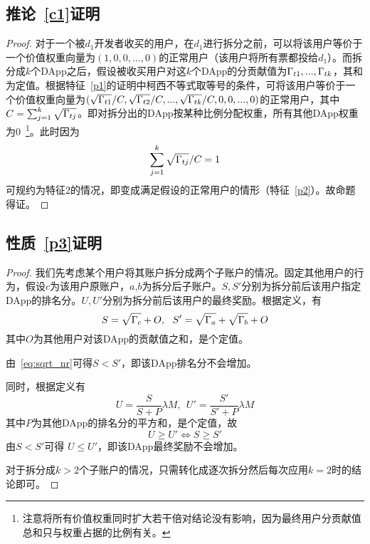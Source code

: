 \subsection{推论~\ref{c1}证明}
\label{subsection:proof3}
\begin{proof}
	对于一个被$d_1$开发者收买的用户，在$d_1$进行拆分之前，可以将该用户等价于一个价值权重向量为$(1,0,0,...,0)$的正常用户（该用户将所有票都投给$d_1$）。而拆分成$k$个DApp之后，假设被收买用户对这$k$个DApp的分贡献值为$\Gamma_{t1},...,\Gamma_{tk}$，其和为定值。根据特征~\ref{p1}的证明中柯西不等式取等号的条件，可将该用户等价于一个价值权重向量为$(\sqrt{\Gamma_{t1}}/C,\sqrt{\Gamma_{t2}}/C,...,\sqrt{\Gamma_{tk}}/C,0,0,...,0)$的正常用户，其中$C=\sum_{j=1}^k \sqrt{\Gamma_{tj}}$。即对拆分出的DApp按某种比例分配权重，所有其他DApp权重为0~\footnote{注意将所有价值权重同时扩大若干倍对结论没有影响，因为最终用户分贡献值总和只与权重占据的比例有关。}。此时因为
	$$\sum_{j=1}^k \sqrt{\Gamma_{tj}}/C =1$$
	可规约为特征2的情况，即变成满足假设的正常用户的情形（特征~\ref{p2}）。故命题得证。
\end{proof}

\subsection{性质~\ref{p3}证明}
\begin{proof}
我们先考虑某个用户将其账户拆分成两个子账户的情况。固定其他用户的行为，假设$c$为该用户原账户，$a$,$b$为拆分后子账户。$S,S'$分别为拆分前后该用户指定DApp的排名分。$U,U'$分别为拆分前后该用户的最终奖励。根据定义，有
$$S= \sqrt{\Gamma_c}+O,~~S'=\sqrt{\Gamma_a}+\sqrt{\Gamma_b}+O$$
其中$O$为其他用户对该DApp的贡献值之和，是个定值。

由~\ref{eq:sqrt_nr}可得$S < S'$，即该DApp排名分不会增加。

同时，根据定义有
$$U = \frac{S}{S+P}\lambda M,~~U' = \frac{S'}{S'+P} \lambda M$$
其中$P$为其他DApp的排名分的平方和，是个定值，故
$$U \geq U' \Leftrightarrow S \geq S'$$
由$S < S' $可得 $U \leq U'$，即该DApp最终奖励不会增加。

对于拆分成$k>2$个子账户的情况，只需转化成逐次拆分然后每次应用$k=2$时的结论即可。
\end{proof}